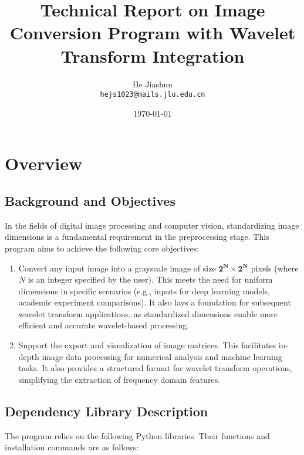 \documentclass[12pt,a4paper]{article}
\title{Technical Report on Image Conversion Program with Wavelet Transform Integration}
\author{
He Jiashun \\ \texttt{hejs1023@mails.jlu.edu.cn}
}
\date{\today}
\begin{document}
\maketitle

\section{Overview}
\subsection{Background and Objectives}
In the fields of digital image processing and computer vision, standardizing image dimensions is a fundamental requirement in the preprocessing stage. This program aims to achieve the following core objectives:  
\begin{enumerate}
    \item Convert any input image into a grayscale image of size \(\mathbf{2^N \times 2^N}\) pixels (where \(N\) is an integer specified by the user). This meets the need for uniform dimensions in specific scenarios (e.g., inputs for deep learning models, academic experiment comparisons). It also lays a foundation for subsequent wavelet transform applications, as standardized dimensions enable more efficient and accurate wavelet-based processing.  
    \item Support the export and visualization of image matrices. This facilitates in-depth image data processing for numerical analysis and machine learning tasks. It also provides a structured format for wavelet transform operations, simplifying the extraction of frequency domain features.  
\end{enumerate}

\subsection{Dependency Library Description}
The program relies on the following Python libraries. Their functions and installation commands are as follows:  
\end{document}
